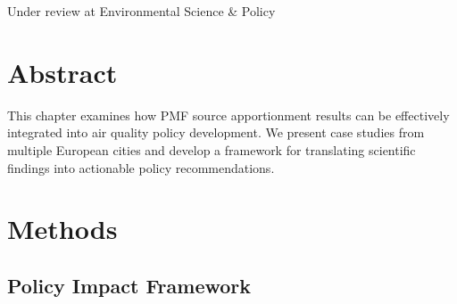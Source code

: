 \documentclass[
  letterpaper,
  oneside,
  openany]{MastersDoctoralThesis}
\begin{document}
Under review at Environmental Science \& Policy

\section{Abstract}\label{abstract-2}

This chapter examines how PMF source apportionment results can be
effectively integrated into air quality policy development. We present
case studies from multiple European cities and develop a framework for
translating scientific findings into actionable policy recommendations.

\section{Methods}\label{methods-1}

\subsection{Policy Impact Framework}\label{policy-impact-framework}
\end{document}

